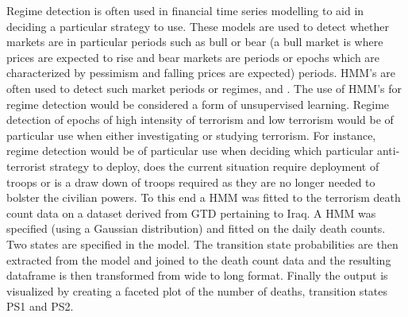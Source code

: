 Regime detection is often used in financial time series modelling to aid in deciding a particular strategy to use. These models are used  to detect whether markets are in particular periods such as bull or bear (a bull market is where prices are expected to rise and bear markets are periods or epochs which are characterized by pessimism and falling prices are expected) periods. HMM’s are often used to detect such market periods or regimes, \citep{RegimeDetection2012} and \citep{bae2014dynamic}. The use of HMM's for regime detection would be considered a form of unsupervised learning. Regime detection of epochs of high intensity of terrorism and low terrorism would be of particular use when either investigating or studying terrorism. For instance, regime detection would be of particular use when deciding which particular anti-terrorist strategy to deploy, does the current situation require deployment of troops or is a draw down of troops required as they are no longer needed to bolster the civilian powers. To this end a HMM was fitted to the terrorism death count data on a dataset derived from GTD pertaining to Iraq. A HMM was specified (using a Gaussian distribution) and fitted on the daily death counts. Two states are specified in the model. The transition state probabilities are then extracted from the model and joined to the death count data and the resulting dataframe is then transformed from wide to long format. Finally the output is visualized by creating a faceted plot of the number of deaths, transition states PS1 and PS2. 

